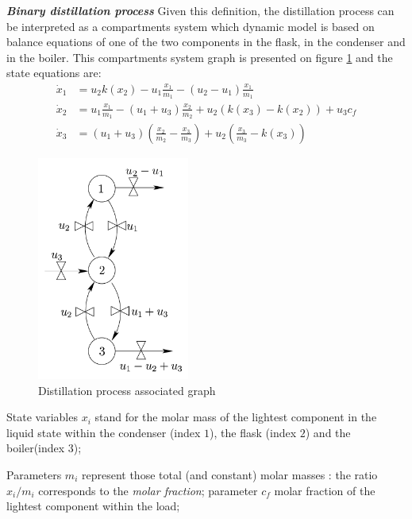 \begin{exemple}{\bf \em Binary distillation process}
Given this definition, the distillation process can be interpreted as a compartments system which dynamic model is based on
balance equations of one of the two components in the flask, in the condenser and in the boiler.
This compartments system graph is presented on figure \ref{Fig:graphdisti} and the state equations are:
\begin{equation*} \begin{split}
\dot x_1 &= u_2 k(x_2) - u_{1}\frac{x_1}{m_1} - (u_2 - u_1) \frac{x_1}{m_1}\\
\dot x_2 &= u_1\frac{x_1}{m_1} - (u_1+u_3)\frac{x_2}{m_2} + u_2(k(x_3) - k(x_2)) + u_3c_f\\
\dot x_3 &= (u_1 + u_3)(\frac{x_2}{m_2} - \frac{x_3}{m_3}) + u_2(\frac{x_3}{m_3} - k(x_3))
\end{split} \end{equation*}
\begin{figure}[h]
\begin{center}
\includegraphics[width=5cm]{images/graphprocdistil}
\caption{Distillation process associated graph}
\label{Fig:graphdisti}
\end{center} 
\end{figure}
State variables $x_i$ stand for the molar mass of the lightest component in the liquid state within
the condenser (index $1$), the flask (index $2$) and the boiler(index  $3$);

Parameters $m_i$ represent those total (and constant) molar masses : 
the ratio $x_i/m_i$ corresponds to the {\it molar fraction}; 
parameter $c_f$ molar fraction of the lightest component within the load; 


\end{exemple}

